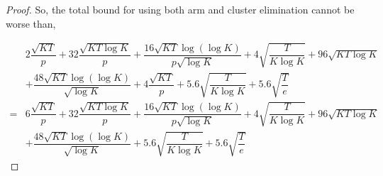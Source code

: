 \begin{proof}
	So, the total bound for using both arm and cluster elimination cannot be worse than,
	
	\begin{align*}
	& 2\dfrac{\sqrt{KT}}{p} + 32\dfrac{\sqrt{KT\log K}}{p} + \dfrac{16\sqrt{KT}\log{(\log K)}}{p\sqrt{\log K}} + 4\sqrt{\dfrac{T}{K\log K}} + 96\sqrt{KT\log K}\\
	& + \dfrac{48\sqrt{KT}\log{(\log K)}}{\sqrt{\log K}} + 4\dfrac{\sqrt{KT}}{p} + 5.6\sqrt{\dfrac{T}{K\log K}} + 5.6\sqrt{\dfrac{T}{e}}\\ 
	= & 6\dfrac{\sqrt{KT}}{p} + 32\dfrac{\sqrt{KT\log K}}{p} + \dfrac{16\sqrt{KT}\log{(\log K)}}{p\sqrt{\log K}} + 4\sqrt{\dfrac{T}{K\log K}} + 96\sqrt{KT\log K}\\
	& + \dfrac{48\sqrt{KT}\log{(\log K)}}{\sqrt{\log K}} + 5.6\sqrt{\dfrac{T}{K\log K}} + 5.6\sqrt{\dfrac{T}{e}} 
	\end{align*}		
	
	

\end{proof}


